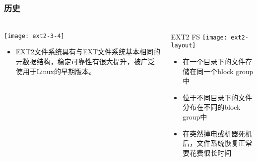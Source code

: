 \begin{frame}[fragile]
	\frametitle{历史}
	
	\frametitle{ }
	\begin{columns}[t]
		\begin{column}{.3\textwidth}
			
			\texttt{[image: ext2-3-4]}
			\begin{itemize}
				\item EXT2文件系统具有与EXT文件系统基本相同的元数据结构，稳定可靠性有很大提升，被广泛使用于Linux的早期版本。
				
			\end{itemize}
			
		\end{column}
		
		\begin{column}{.7\textwidth}			
			EXT2 FS
			\texttt{[image: ext2-layout]}
			\begin{itemize}
				\item 在一个目录下的文件存储在同一个block group中
				\item 位于不同目录下的文件分布在不同的block group中
				\item 在突然掉电或机器死机后，文件系统恢复正常要花费很长时间
			\end{itemize}
			
		\end{column}
	\end{columns}
	
\end{frame}



